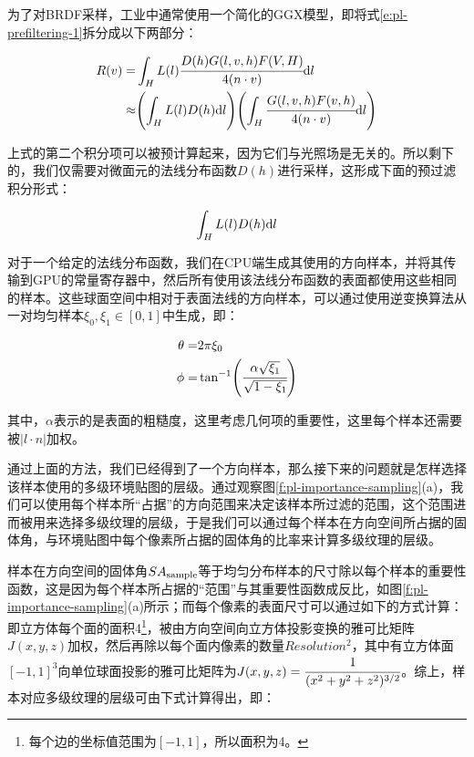 为了对BRDF采样，工业中通常使用一个简化的GGX模型\cite{a:Physically-basedlightingincallofduty:Black,a:Gettingmorephysicalincallofduty:Blackopsii,a:RealShadinginUnrealEngine4}，即将式\ref{e:pl-prefiltering-1}拆分成以下两部分：

\begin{equation}
\begin{aligned}
	R(v)=&\int_H L(l)\cfrac{D(h)G(l,v,h)F(V,H)}{4(n\cdot v)}{\rm d}l\\
	\approx&\Biggl(\int_H L(l)D(h){\rm d}l\Biggl)\Biggl(\int_H \cfrac{G(l,v,h)F(v,h)}{4(n\cdot v)}{\rm d}l\Biggl)
\end{aligned}
\end{equation}

上式的第二个积分项可以被预计算起来，因为它们与光照场是无关的。所以剩下的，我们仅需要对微面元的法线分布函数$D(h)$进行采样，这形成下面的预过滤积分形式：

\begin{equation}\label{e:pl-intergal-directional}
	\int_H L(l)D(h){\rm d}l
\end{equation}

对于一个给定的法线分布函数，我们在CPU端生成其使用的方向样本，并将其传输到GPU的常量寄存器中，然后所有使用该法线分布函数的表面都使用这些相同的样本。这些球面空间中相对于表面法线的方向样本，可以通过使用逆变换算法从一对均匀样本$\xi_0,\xi_1\in[0,1]$中生成，即：

\begin{equation}\label{e:pl-uniform-sampling}
\begin{aligned}
	\theta=&2\pi \xi_0\\
	\phi=&\tan^{-1}\Biggl(\cfrac{\alpha\sqrt{\xi_1}}{\sqrt{1-\xi_1}}\Biggl)
\end{aligned}
\end{equation}

\noindent 其中，$\alpha$表示的是表面的粗糙度，这里考虑几何项的重要性，这里每个样本还需要被$|l\cdot n|$加权。

通过上面的方法，我们已经得到了一个方向样本，那么接下来的问题就是怎样选择该样本使用的多级环境贴图的层级。通过观察图\ref{f:pl-importance-sampling}(a)，我们可以使用每个样本所“占据”的方向范围来决定该样本所过滤的范围，这个范围进而被用来选择多级纹理的层级，于是我们可以通过每个样本在方向空间所占据的固体角，与环境贴图中每个像素所占据的固体角的比率来计算多级纹理的层级。

样本在方向空间的固体角$SA_{\rm sample}$等于均匀分布样本的尺寸除以每个样本的重要性函数，这是因为每个样本所占据的“范围”与其重要性函数成反比，如图\ref{f:pl-importance-sampling}(a)所示；而每个像素的表面尺寸可以通过如下的方式计算：即立方体每个面的面积4\footnote{每个边的坐标值范围为$[-1,1]$，所以面积为4。}，被由方向空间向立方体投影变换的雅可比矩阵$J(x,y,z)$加权，然后再除以每个面内像素的数量$Resolution^{2}$，其中有立方体面$[-1,1]^{3}$向单位球面投影的雅可比矩阵为$J(x,y,z)=\cfrac{1}{(x^{2}+y^{2}+z^{2})^{3/2}}$。综上，样本对应多级纹理的层级可由下式计算得出，即：

